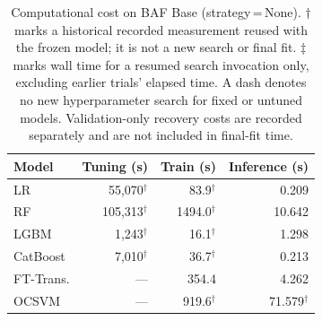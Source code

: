 \begin{table}[ht!]
\centering
\caption{Computational cost on BAF Base (strategy\,=\,None). $\dagger$ marks a historical recorded measurement reused with the frozen model; it is not a new search or final fit. $\ddagger$ marks wall time for a resumed search invocation only, excluding earlier trials' elapsed time. A dash denotes no new hyperparameter search for fixed or untuned models. Validation-only recovery costs are recorded separately and are not included in final-fit time.}
\label{tab:cost_baf}
\begin{tabular}{l r r r}
\toprule
Model & Tuning (s) & Train (s) & Inference (s) \\
\midrule
LR         & 55,070$^{\dagger}$ & 83.9$^{\dagger}$ & 0.209 \\
RF         & 105,313$^{\dagger}$ & 1494.0$^{\dagger}$ & 10.642 \\
LGBM       & 1,243$^{\dagger}$ & 16.1$^{\dagger}$ & 1.298 \\
CatBoost   & 7,010$^{\dagger}$ & 36.7$^{\dagger}$ & 0.213 \\
FT-Trans.  & --- & 354.4 & 4.262 \\
OCSVM      & --- & 919.6$^{\dagger}$ & 71.579$^{\dagger}$ \\
\bottomrule
\end{tabular}
\end{table}